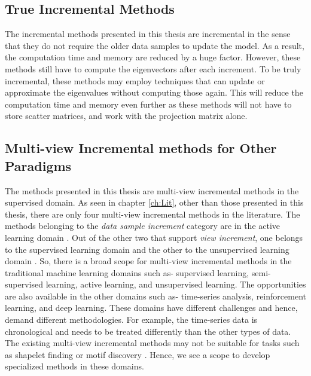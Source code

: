 \subsection*{True Incremental Methods}
The incremental methods presented in this thesis are incremental in the sense that they do not require the older data samples to update the model. As a result, the computation time and memory are reduced by a huge factor. However, these methods still have to compute the eigenvectors after each increment. To be truly incremental, these methods may employ techniques that can update or approximate the eigenvalues without computing those again. This will reduce the computation time and memory even further as these methods will not have to store scatter matrices, and work with the projection matrix alone.

\subsection*{Multi-view Incremental methods for Other Paradigms}
The methods presented in this thesis are multi-view incremental methods in the supervised domain. As seen in chapter \ref{ch:Lit}, other than those presented in this thesis, there are only four multi-view incremental methods in the literature. The methods belonging to the \textit{data sample increment} category are in the active learning domain \cite{NieLQZJ18, NieFHYZM20}. Out of the other two that support \textit{view increment}, one belongs to the supervised learning domain \cite{ZhouSDY19} and the other to the unsupervised learning domain \cite{ZhouSDYL19}. So, there is a broad scope for multi-view incremental methods in the traditional machine learning domains such as- supervised learning, semi-supervised learning, active learning, and unsupervised learning. The opportunities are also available in the other domains such as- time-series analysis, reinforcement learning, and deep learning. These domains have different challenges and hence, demand different methodologies. For example, the time-series data is chronological and needs to be treated differently than the other types of data. The existing multi-view incremental methods may not be suitable for tasks such as shapelet finding \cite{LinesDHB12} or motif discovery \cite{TorkamaniL17}. Hence, we see a scope to develop specialized methods in these domains.




\chapterend
\cleardoublepage